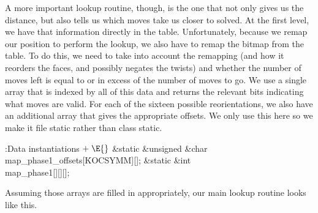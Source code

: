 A more important lookup routine, though, is the one that not only gives
us the distance, but also tells us which moves take us closer to solved.
At the first level, we have that information directly in the table.
Unfortunately, because we remap our position to perform the lookup, we
also have to remap the bitmap from the table.  To do this, we need to
take into account the remapping (and how it reorders the faces, and
possibly negates the twists) and whether the number of moves left is
equal to or in excess of the number of moves to go.  We use a single
array  that is indexed by all of this data and returns the
relevant bits indicating what moves are valid.  For each of the sixteen
possible reorientations, we also have an additional array that gives
the appropriate offsets.  We only use this here so we make it file static
rather than class static.

\Y\B\4:Data instantiations\X${}\mathrel+\E{}$\6
\&{static} \&{unsigned} \&{char} \\{map\_phase1\_offsets}[\.{KOCSYMM}][];\6
\&{static} \&{int} \\{map\_phase1}[][][];\par
\fi

Assuming those arrays are filled in appropriately, our main lookup
routine looks like this.

